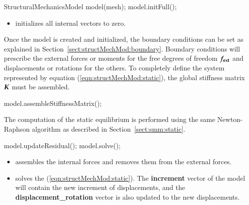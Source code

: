 \begin{cpp}
  StructuralMechanicsModel model(mesh);
  model.initFull();
\end{cpp}


\begin{itemize}
\item {} initializes all internal vectors to zero.
\end{itemize}


Once the model is created and initialized, the boundary conditions can
be set as explained in Section~\ref{sect:structMechMod:boundary}.
Boundary conditions will prescribe the external forces or moments for
the free degrees of freedom $\boldsymbol{f_{{\mathrm{ext}}}}$ and displacements or
rotations for the others.  To completely define the system represented
by equation (\ref{eqn:structMechMod:static}), the global stiffness
matrix $\boldsymbol{K}$ must be assembled.

\begin{cpp}
  model.assembleStiffnessMatrix();
\end{cpp}

The computation of the static equilibrium is performed using the same
Newton-Raphson algorithm as described in
Section~\ref{sect:smm:static}.


\begin{cpp}
  model.updateResidual();
  model.solve();
\end{cpp}

\begin{itemize}

\item {} assembles the internal forces and
  removes them from the external forces.
\item {} solves the (\ref{eqn:structMechMod:static}).
  The \textbf{increment} vector of the model will contain the new
  increment of displacements, and the \textbf{displacement\_rotation}
  vector is also updated to the new displacements.

\end{itemize}

